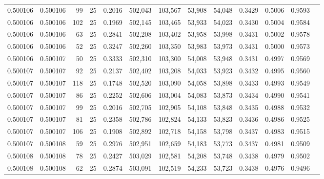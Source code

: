 \begin{tabular}{rrrrrrrrrrrrr}
0.500106 & 0.500106 &    99 &  25 &                                     0.2016 & 502,043 & 103,567 &  53,908 &  54,048 & 0.3429 & 0.5006 & 0.9593 \\
0.500106 & 0.500106 &   102 &  25 &                                     0.1969 & 502,145 & 103,465 &  53,933 &  54,023 & 0.3430 & 0.5004 & 0.9584 \\
0.500106 & 0.500106 &    63 &  25 &                                     0.2841 & 502,208 & 103,402 &  53,958 &  53,998 & 0.3431 & 0.5002 & 0.9578 \\
0.500106 & 0.500106 &    52 &  25 &                                     0.3247 & 502,260 & 103,350 &  53,983 &  53,973 & 0.3431 & 0.5000 & 0.9573 \\
0.500106 & 0.500107 &    50 &  25 &                                     0.3333 & 502,310 & 103,300 &  54,008 &  53,948 & 0.3431 & 0.4997 & 0.9569 \\
0.500107 & 0.500107 &    92 &  25 &                                     0.2137 & 502,402 & 103,208 &  54,033 &  53,923 & 0.3432 & 0.4995 & 0.9560 \\
0.500107 & 0.500107 &   118 &  25 &                                     0.1748 & 502,520 & 103,090 &  54,058 &  53,898 & 0.3433 & 0.4993 & 0.9549 \\
0.500107 & 0.500107 &    86 &  25 &                                     0.2252 & 502,606 & 103,004 &  54,083 &  53,873 & 0.3434 & 0.4990 & 0.9541 \\
0.500107 & 0.500107 &    99 &  25 &                                     0.2016 & 502,705 & 102,905 &  54,108 &  53,848 & 0.3435 & 0.4988 & 0.9532 \\
0.500107 & 0.500107 &    81 &  25 &                                     0.2358 & 502,786 & 102,824 &  54,133 &  53,823 & 0.3436 & 0.4986 & 0.9525 \\
0.500107 & 0.500107 &   106 &  25 &                                     0.1908 & 502,892 & 102,718 &  54,158 &  53,798 & 0.3437 & 0.4983 & 0.9515 \\
0.500107 & 0.500108 &    59 &  25 &                                     0.2976 & 502,951 & 102,659 &  54,183 &  53,773 & 0.3437 & 0.4981 & 0.9509 \\
0.500108 & 0.500108 &    78 &  25 &                                     0.2427 & 503,029 & 102,581 &  54,208 &  53,748 & 0.3438 & 0.4979 & 0.9502 \\
0.500108 & 0.500108 &    62 &  25 &                                     0.2874 & 503,091 & 102,519 &  54,233 &  53,723 & 0.3438 & 0.4976 & 0.9496 \\

\end{tabular}
